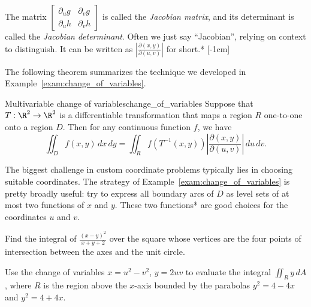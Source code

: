 \documentclass[indent]{watsonbook}
\begin{document}
{The matrix $\left[
  \begin{array}{cc}
    \partial_u g & \partial _v g \\
    \partial_u h & \partial _v h
  \end{array} \right]$ is called the \textit{Jacobian matrix}, and
its determinant is called the \textit{Jacobian determinant}. Often we just say
``Jacobian'', relying on context to distinguish. It can be written
as $\left|\frac{\partial (x,y)}{\partial (u,v)} \right|$ for
short.* [-1cm]

The following theorem summarizes the technique we developed in
Example~\ref{exam:change_of_variables}.

\begin{theo}{Multivariable change of variables}{change_of_variables}
  Suppose that $T: \R^2 \to \R^2$ is a differentiable transformation
  that maps a region $R$ one-to-one onto a region $D$. Then for any
  continuous function $f$, we have
  \[
    \iint_D f(x,y) \, {d} x\, {d} y = \iint_R f(T^{-1}(x,y)) \left|
      \frac{\partial (x,y)}{\partial (u,v)} \right| \, {{d}}u \, {{d}}v.
  \]
\end{theo}

The biggest challenge in custom coordinate problems typically lies in
choosing suitable coordinates. The strategy of
Example~\ref{exam:change_of_variables} is pretty broadly useful: try
to express all boundary arcs of $D$ as level sets of at most two
functions of $x$ and $y$. These two functions* are good choices for
the coordinates $u$ and $v$. 

\begin{exercise}{}{}
  Find the integral of $\frac{(x-y)^2}{x+y+2}$ over the square whose
  vertices are the four points of intersection between the axes and
  the unit circle.
\end{exercise}

\begin{exercise}{}{}
  Use the change of variables $x = u^2 - v^2$, $y = 2uv$ to evaluate the
  integral $\iint_R y \,{d} A$, where $R$ is the region above the $x$-axis
  bounded by the parabolas $y^2 = 4-4x$ and $y^2 = 4+4x$.
\end{exercise}

}
\end{document}
